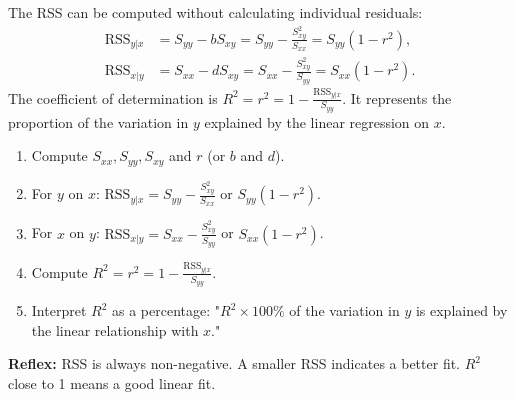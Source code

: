 \documentclass[11pt]{article}
\newcommand{\cle}[1]{{\popxbold\color{popdark}#1}}
\begin{document}
\begin{propriete}
The RSS can be computed without calculating individual residuals:
\begin{align*}
\text{RSS}_{y|x} &= S_{yy} - b S_{xy} = S_{yy} - \frac{S_{xy}^2}{S_{xx}} = S_{yy}(1 - r^2), \\
\text{RSS}_{x|y} &= S_{xx} - d S_{xy} = S_{xx} - \frac{S_{xy}^2}{S_{yy}} = S_{xx}(1 - r^2).
\end{align*}
The \cle{coefficient of determination} is $R^2 = r^2 = 1 - \frac{\text{RSS}_{y|x}}{S_{yy}}$. It represents the proportion of the variation in $y$ explained by the linear regression on $x$.
\end{propriete}

\begin{methode}
\begin{enumerate}
\item Compute $S_{xx}, S_{yy}, S_{xy}$ and $r$ (or $b$ and $d$).
\item For $y$ on $x$: $\text{RSS}_{y|x} = S_{yy} - \frac{S_{xy}^2}{S_{xx}}$ or $S_{yy}(1-r^2)$.
\item For $x$ on $y$: $\text{RSS}_{x|y} = S_{xx} - \frac{S_{xy}^2}{S_{yy}}$ or $S_{xx}(1-r^2)$.
\item Compute $R^2 = r^2 = 1 - \frac{\text{RSS}_{y|x}}{S_{yy}}$.
\item Interpret $R^2$ as a percentage: "$R^2 \times 100\%$ of the variation in $y$ is explained by the linear relationship with $x$."
\end{enumerate}
\textbf{Reflex:} RSS is always non-negative. A smaller RSS indicates a better fit. $R^2$ close to 1 means a good linear fit.
\end{methode}
\end{document}
